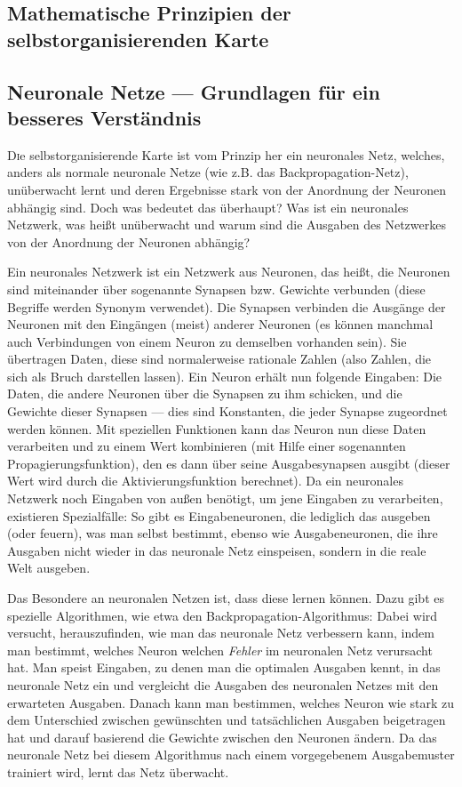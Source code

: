 \documentclass[twoside,a4paper,draft]{article}
\newcommand{\commonlettrine}[1]{\lettrine[nindent=0em,lines=2]{#1}}
\begin{document}
\begin{multicols}{2}
\section{Mathematische Prinzipien der selbstorganisierenden Karte}
\subsection{Neuronale Netze --- Grundlagen für ein besseres Verständnis}

\commonlettrine{D}ie selbstorganisierende Karte ist vom Prinzip her ein neuronales Netz, welches, anders als \glqq{}normale\grqq{} neuronale Netze (wie z.B. das Backpropagation-Netz), unüberwacht lernt und deren Ergebnisse stark von der Anordnung der Neuronen abhängig sind. Doch was bedeutet das überhaupt? Was ist ein neuronales Netzwerk, was heißt \glqq{}unüberwacht\grqq{} und warum sind die Ausgaben des Netzwerkes von der Anordnung der Neuronen abhängig?

Ein neuronales Netzwerk ist ein Netzwerk aus Neuronen, das heißt, die Neuronen sind miteinander über sogenannte Synapsen bzw. Gewichte verbunden (diese Begriffe werden Synonym verwendet). Die Synapsen verbinden die Ausgänge der Neuronen mit den Eingängen (meist) anderer Neuronen (es können manchmal auch Verbindungen von einem Neuron zu demselben vorhanden sein). Sie übertragen Daten, diese sind normalerweise rationale Zahlen (also Zahlen, die sich als Bruch darstellen lassen). Ein Neuron erhält nun folgende Eingaben: Die Daten, die andere Neuronen über die Synapsen zu ihm schicken, und die \glqq{}Gewichte\grqq{} dieser Synapsen --- dies sind Konstanten, die jeder Synapse zugeordnet werden können. Mit speziellen Funktionen kann das Neuron nun diese Daten verarbeiten und zu einem Wert kombinieren (mit Hilfe einer sogenannten Propagierungsfunktion), den es dann über seine Ausgabesynapsen ausgibt (dieser Wert wird durch die Aktivierungsfunktion berechnet). Da ein neuronales Netzwerk noch Eingaben von außen benötigt, um jene Eingaben zu verarbeiten, existieren Spezialfälle: So gibt es Eingabeneuronen, die lediglich das ausgeben (oder \glqq{}feuern\grqq{}), was man selbst bestimmt, ebenso wie Ausgabeneuronen, die ihre Ausgaben nicht wieder in das neuronale Netz einspeisen, sondern in die reale Welt ausgeben.

Das Besondere an neuronalen Netzen ist, dass diese lernen können. Dazu gibt es spezielle Algorithmen, wie etwa den Backpropagation-Algorithmus: Dabei wird versucht, herauszufinden, wie man das neuronale Netz verbessern kann, indem man bestimmt, welches Neuron welchen \emph{Fehler} im neuronalen Netz verursacht hat. Man speist Eingaben, zu denen man die optimalen Ausgaben kennt, in das neuronale Netz ein und vergleicht die Ausgaben des neuronalen Netzes mit den erwarteten Ausgaben. Danach kann man bestimmen, welches Neuron wie stark zu dem Unterschied zwischen gewünschten und tatsächlichen Ausgaben beigetragen hat und darauf basierend die Gewichte zwischen den Neuronen ändern. Da das neuronale Netz bei diesem Algorithmus nach einem vorgegebenem Ausgabemuster trainiert wird, lernt das Netz \glqq{}überwacht\grqq{}. 


\end{multicols}
\end{document}
